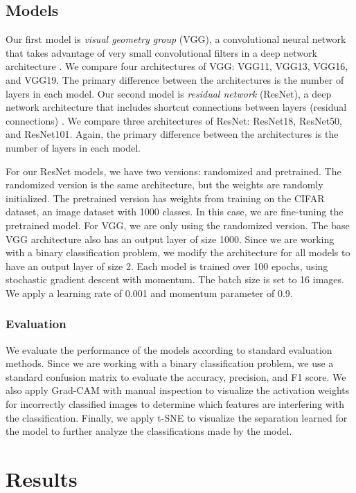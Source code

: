 \documentclass{aci}
\numberwithin{equation}{section}
\begin{document}
\subsection{Models}

Our first model is \textit{visual geometry group} (VGG), a convolutional neural
network that takes advantage of very small convolutional filters in a deep
network architecture \cite{simonyan_very_2015}. We compare four architectures of
VGG: VGG11, VGG13, VGG16, and VGG19. The primary difference between the
architectures is the number of layers in each model. Our second model is
\textit{residual network} (ResNet), a deep network architecture that includes
shortcut connections between layers (residual connections) \cite{he_deep_2015}.
We compare three architectures of ResNet: ResNet18, ResNet50, and ResNet101.
Again, the primary difference between the architectures is the number of layers
in each model.

For our ResNet models, we have two versions: randomized and pretrained. The
randomized version is the same architecture, but the weights are randomly
initialized. The pretrained version has weights from training on the CIFAR
dataset, an image dataset with 1000 classes. In this case, we are fine-tuning
the pretrained model. For VGG, we are only using the randomized version. The
base VGG architecture also has an output layer of size 1000. Since we are
working with a binary classification problem, we modify the architecture for all
models to have an output layer of size 2. Each model is trained over 100 epochs,
using stochastic gradient descent with momentum. The batch size is set to 16
images. We apply a learning rate of 0.001 and momentum parameter of 0.9.

\subsubsection{Evaluation}

We evaluate the performance of the models according to standard evaluation
methods. Since we are working with a binary classification problem, we use a
standard confusion matrix to evaluate the accuracy, precision, and F1 score. We
also apply Grad-CAM with manual inspection to visualize the activation weights
for incorrectly classified images to determine which features are interfering
with the classification. Finally, we apply t-SNE to visualize the separation
learned for the model to further analyze the classifications made by the model.

\section{Results}
\end{document}
